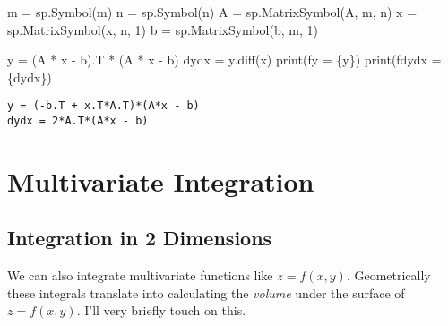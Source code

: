 \documentclass[
  letterpaper,
  DIV=11,
  numbers=noendperiod]{scrreprt}
\newenvironment{Shaded}{\begin{snugshade}}{\end{snugshade}}
\newcommand{\BuiltInTok}[1]{\textcolor[rgb]{0.00,0.23,0.31}{#1}}
\newcommand{\DecValTok}[1]{\textcolor[rgb]{0.68,0.00,0.00}{#1}}
\newcommand{\NormalTok}[1]{\textcolor[rgb]{0.00,0.23,0.31}{#1}}
\newcommand{\OperatorTok}[1]{\textcolor[rgb]{0.37,0.37,0.37}{#1}}
\newcommand{\SpecialCharTok}[1]{\textcolor[rgb]{0.37,0.37,0.37}{#1}}
\newcommand{\SpecialStringTok}[1]{\textcolor[rgb]{0.13,0.47,0.30}{#1}}
\newcommand{\StringTok}[1]{\textcolor[rgb]{0.13,0.47,0.30}{#1}}
\begin{document}
\begin{Shaded}
\begin{Highlighting}[]
\NormalTok{m }\OperatorTok{=}\NormalTok{ sp.Symbol(}\StringTok{\textquotesingle{}m\textquotesingle{}}\NormalTok{)}
\NormalTok{n }\OperatorTok{=}\NormalTok{ sp.Symbol(}\StringTok{\textquotesingle{}n\textquotesingle{}}\NormalTok{)}
\NormalTok{A }\OperatorTok{=}\NormalTok{ sp.MatrixSymbol(}\StringTok{\textquotesingle{}A\textquotesingle{}}\NormalTok{, m, n)}
\NormalTok{x }\OperatorTok{=}\NormalTok{ sp.MatrixSymbol(}\StringTok{\textquotesingle{}x\textquotesingle{}}\NormalTok{, n, }\DecValTok{1}\NormalTok{)}
\NormalTok{b }\OperatorTok{=}\NormalTok{ sp.MatrixSymbol(}\StringTok{\textquotesingle{}b\textquotesingle{}}\NormalTok{, m, }\DecValTok{1}\NormalTok{)}

\NormalTok{y }\OperatorTok{=}\NormalTok{ (A }\OperatorTok{*}\NormalTok{ x }\OperatorTok{{-}}\NormalTok{ b).T }\OperatorTok{*}\NormalTok{ (A }\OperatorTok{*}\NormalTok{ x }\OperatorTok{{-}}\NormalTok{ b)}
\NormalTok{dydx }\OperatorTok{=}\NormalTok{ y.diff(x)}
\BuiltInTok{print}\NormalTok{(}\SpecialStringTok{f\textquotesingle{}y = }\SpecialCharTok{\{}\NormalTok{y}\SpecialCharTok{\}}\SpecialStringTok{\textquotesingle{}}\NormalTok{)}
\BuiltInTok{print}\NormalTok{(}\SpecialStringTok{f\textquotesingle{}dydx = }\SpecialCharTok{\{}\NormalTok{dydx}\SpecialCharTok{\}}\SpecialStringTok{\textquotesingle{}}\NormalTok{)}
\end{Highlighting}
\end{Shaded}

\begin{verbatim}
y = (-b.T + x.T*A.T)*(A*x - b)
dydx = 2*A.T*(A*x - b)
\end{verbatim}

\hypertarget{multivariate-integration}{%
\section{Multivariate Integration}\label{multivariate-integration}}

\hypertarget{integration-in-2-dimensions}{%
\subsection{Integration in 2
Dimensions}\label{integration-in-2-dimensions}}

We can also integrate multivariate functions like \(z=f(x,y)\).
Geometrically these integrals translate into calculating the
\emph{volume} under the surface of \(z=f(x,y)\). I'll very briefly touch
on this.
\end{document}

